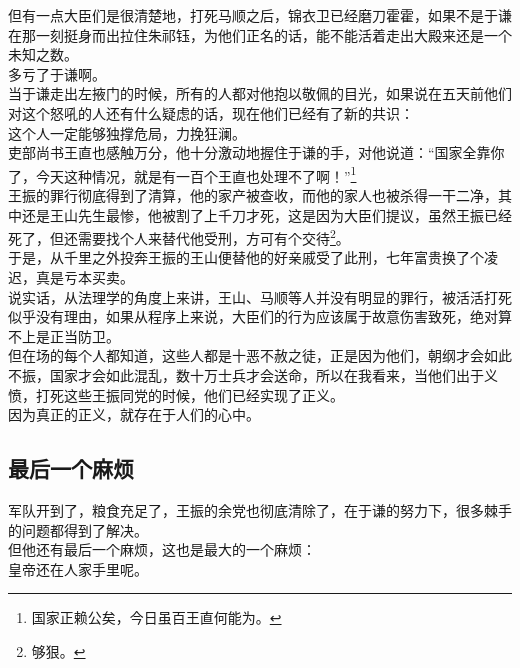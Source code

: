 \begin{multicols}{\theparacolNo}
但有一点大臣们是很清楚地，打死马顺之后，锦衣卫已经磨刀霍霍，如果不是于谦在那一刻挺身而出拉住朱祁钰，为他们正名的话，能不能活着走出大殿来还是一个未知之数。\\

多亏了于谦啊。\\

当于谦走出左掖门的时候，所有的人都对他抱以敬佩的目光，如果说在五天前他们对这个怒吼的人还有什么疑虑的话，现在他们已经有了新的共识：\\

这个人一定能够独撑危局，力挽狂澜。\\

吏部尚书王直也感触万分，他十分激动地握住于谦的手，对他说道：“国家全靠你了，今天这种情况，就是有一百个王直也处理不了啊！”\footnote{国家正赖公矣，今日虽百王直何能为。}\\

王振的罪行彻底得到了清算，他的家产被查收，而他的家人也被杀得一干二净，其中还是王山先生最惨，他被割了上千刀才死，这是因为大臣们提议，虽然王振已经死了，但还需要找个人来替代他受刑，方可有个交待\footnote{够狠。}。\\

于是，从千里之外投奔王振的王山便替他的好亲戚受了此刑，七年富贵换了个凌迟，真是亏本买卖。\\

说实话，从法理学的角度上来讲，王山、马顺等人并没有明显的罪行，被活活打死似乎没有理由，如果从程序上来说，大臣们的行为应该属于故意伤害致死，绝对算不上是正当防卫。\\

但在场的每个人都知道，这些人都是十恶不赦之徒，正是因为他们，朝纲才会如此不振，国家才会如此混乱，数十万士兵才会送命，所以在我看来，当他们出于义愤，打死这些王振同党的时候，他们已经实现了正义。\\

因为真正的正义，就存在于人们的心中。\\

\subsection{最后一个麻烦}
军队开到了，粮食充足了，王振的余党也彻底清除了，在于谦的努力下，很多棘手的问题都得到了解决。\\

但他还有最后一个麻烦，这也是最大的一个麻烦：\\

皇帝还在人家手里呢。\\


\end{multicols}
